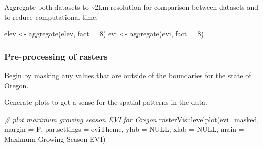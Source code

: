 \documentclass[
]{article}
\newenvironment{Shaded}{\begin{snugshade}}{\end{snugshade}}
\newcommand{\AttributeTok}[1]{\textcolor[rgb]{0.77,0.63,0.00}{#1}}
\newcommand{\CommentTok}[1]{\textcolor[rgb]{0.56,0.35,0.01}{\textit{#1}}}
\newcommand{\ConstantTok}[1]{\textcolor[rgb]{0.00,0.00,0.00}{#1}}
\newcommand{\DecValTok}[1]{\textcolor[rgb]{0.00,0.00,0.81}{#1}}
\newcommand{\FunctionTok}[1]{\textcolor[rgb]{0.00,0.00,0.00}{#1}}
\newcommand{\NormalTok}[1]{#1}
\newcommand{\OtherTok}[1]{\textcolor[rgb]{0.56,0.35,0.01}{#1}}
\newcommand{\SpecialCharTok}[1]{\textcolor[rgb]{0.00,0.00,0.00}{#1}}
\newcommand{\StringTok}[1]{\textcolor[rgb]{0.31,0.60,0.02}{#1}}
\begin{document}
Aggregate both datasets to \textasciitilde2km resolution for comparison
between datasets and to reduce computational time.

\begin{Shaded}
\begin{Highlighting}[]
\NormalTok{elev }\OtherTok{\textless{}{-}} \FunctionTok{aggregate}\NormalTok{(elev, }\AttributeTok{fact =} \DecValTok{8}\NormalTok{)}
\NormalTok{evi }\OtherTok{\textless{}{-}} \FunctionTok{aggregate}\NormalTok{(evi, }\AttributeTok{fact =} \DecValTok{8}\NormalTok{)}
\end{Highlighting}
\end{Shaded}

\hypertarget{pre-processing-of-rasters}{%
\subsubsection{Pre-processing of
rasters}\label{pre-processing-of-rasters}}

Begin by masking any values that are outside of the boundaries for the
state of Oregon.

\begin{Shaded}
\end{Shaded}

Generate plots to get a sense for the spatial patterns in the data.

\begin{Shaded}
\begin{Highlighting}[]
\CommentTok{\# plot maximum growing season EVI for Oregon}
\NormalTok{rasterVis}\SpecialCharTok{::}\FunctionTok{levelplot}\NormalTok{(evi\_masked, }\AttributeTok{margin =}\NormalTok{ F, }\AttributeTok{par.settings =}\NormalTok{ eviTheme, }
                     \AttributeTok{ylab =} \ConstantTok{NULL}\NormalTok{, }\AttributeTok{xlab =} \ConstantTok{NULL}\NormalTok{, }
                     \AttributeTok{main =} \StringTok{\textquotesingle{}Maximum Growing Season EVI\textquotesingle{}}\NormalTok{)}
\end{Highlighting}
\end{Shaded}
\end{document}
